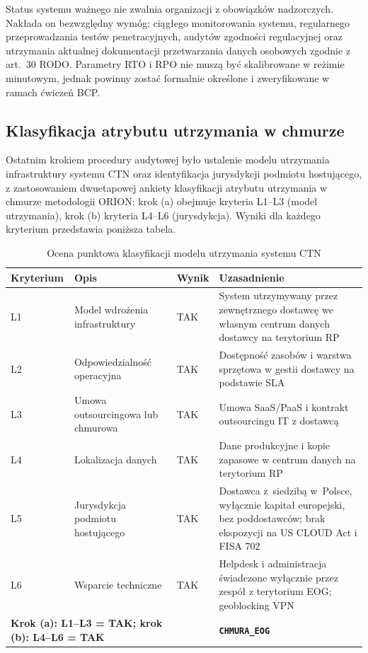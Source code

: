 Status systemu ważnego nie zwalnia organizacji z obowiązków nadzorczych. Nakłada on bezwzględny wymóg: ciągłego monitorowania systemu, regularnego przeprowadzania testów penetracyjnych, audytów zgodności regulacyjnej oraz utrzymania aktualnej dokumentacji przetwarzania danych osobowych zgodnie z art.~30 RODO. Parametry RTO i RPO nie muszą być skalibrowane w reżimie minutowym, jednak powinny zostać formalnie określone i zweryfikowane w ramach ćwiczeń BCP.

\subsection{Klasyfikacja atrybutu utrzymania w chmurze}

Ostatnim krokiem procedury audytowej było ustalenie modelu utrzymania infrastruktury systemu CTN oraz identyfikacja jurysdykcji podmiotu hostującego, z zastosowaniem dwuetapowej ankiety klasyfikacji atrybutu utrzymania w chmurze metodologii ORION: krok (a) obejmuje kryteria L1--L3 (model utrzymania), krok (b) kryteria L4--L6 (jurysdykcja). Wyniki dla każdego kryterium przedstawia poniższa tabela.

\begin{table}[H]
\centering
\caption{Ocena punktowa klasyfikacji modelu utrzymania systemu CTN}
\renewcommand{\arraystretch}{1.4}
\begin{tabular}{p{2.1cm} p{5.2cm} p{1.4cm} p{5cm}}
\toprule
\textbf{Kryterium} & \textbf{Opis} & \textbf{Wynik} & \textbf{Uzasadnienie} \\
\midrule
L1 & Model wdrożenia infrastruktury & TAK & System utrzymywany przez zewnętrznego dostawcę we własnym centrum danych dostawcy na terytorium RP \\
\midrule
L2 & Odpowiedzialność operacyjna & TAK & Dostępność zasobów i warstwa sprzętowa w gestii dostawcy na podstawie SLA \\
\midrule
L3 & Umowa outsourcingowa lub chmurowa & TAK & Umowa SaaS/PaaS i kontrakt outsourcingu IT z dostawcą \\
\midrule
L4 & Lokalizacja danych & TAK & Dane produkcyjne i kopie zapasowe w centrum danych na terytorium RP \\
\midrule
L5 & Jurysdykcja podmiotu hostującego & TAK & Dostawca z~siedzibą w~Polsce, wyłącznie kapitał europejski, bez poddostawców; brak ekspozycji na US CLOUD Act i FISA 702 \\
\midrule
L6 & Wsparcie techniczne & TAK & Helpdesk i administracja świadczone wyłącznie przez zespół z terytorium EOG; geoblocking VPN \\
\midrule
\multicolumn{2}{l}{\textbf{Krok (a): L1--L3 = TAK; krok (b): L4--L6 = TAK}} & & \textbf{\texttt{CHMURA\_EOG}} \\
\bottomrule
\end{tabular}
\end{table}


